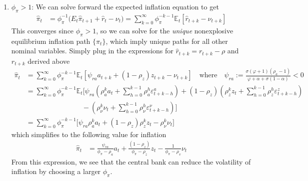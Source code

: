 \documentclass[12pt]{article}
\theoremstyle{plain}
\theoremstyle{definition}
\theoremstyle{remark}
\newcommand{\E}{\mathbb{E}}
\begin{document}
\begin{enumerate}[label=(\roman*)]
  \item $\phi_\pi>1$: We can solve forward the expected inflation
    equation to get
    \begin{align*}
      \hat{\pi}_t
      &=
      \phi_\pi^{-1}
      \big(
      E_t\hat{\pi}_{t+1} + \hat{r}_t - \nu_t
      \big)
      =
      \sum_{k=0}^\infty
      \phi_\pi^{-k-1}
      \E_t[\hat{r}_{t+k}-\nu_{t+k}]
    \end{align*}
    This converges since $\phi_\pi>1$, so we can solve for the
    \emph{unique} nonexplosive equilibrium inflation path
    $\{\pi_t\}$, which imply unique paths for all other nominal
    variables. Simply plug in the expressions for
    $\hat{r}_{t+k}=r_{t+k}-\rho$ and $r_{t+k}$ derived above
    \begin{align*}
      \hat{\pi}_t
      &=
      \sum_{k=0}^\infty
      \phi_\pi^{-k-1}
      \E_t\left[
      \psi_{ra}
      a_{t+k}
      + (1-\rho_z)z_{t+k}
      -\nu_{t+k}
      \right]
      \quad\text{where}\quad
      \psi_{ra}
      :=
      \frac{\sigma(\varphi + 1)(\rho_a-1)}{\varphi +\alpha+ \sigma(1-\alpha)}
      < 0
      \\
      &=
      \sum_{k=0}^\infty
      \phi_\pi^{-k-1}
      \E_t\bigg[
      \psi_{ra}
      \left(
      \rho_a^k a_t
      + \sum_{h=0}^{k-1} \rho_a^h\varepsilon^a_{t+k-h}
      \right)
      + (1-\rho_z)
      \left(
      \rho_z^k z_t
      + \sum_{h=0}^{k-1} \rho_z^h\varepsilon^z_{t+k-h}
      \right)
      \\
      &\qquad\qquad\qquad\qquad
      -
      \left(
      \rho_\nu^k \nu_t
      + \sum_{h=0}^{k-1} \rho_\nu^h\varepsilon^\nu_{t+k-h}
      \right)
      \bigg]
      \\
      &=
      \sum_{k=0}^\infty
      \phi_\pi^{-k-1}
      \big[
      \psi_{ra}
      \rho_a^k a_t
      + (1-\rho_z)
      \rho_z^k z_t
      -\rho_\nu^k\nu_{t}
      \big]
    \end{align*}
    which simplifies to the following value for inflation
    \begin{align*}
      \hat{\pi}_t
      &=
      \frac{\psi_{ra}}{\phi_\pi-\rho_a}a_t
      + \frac{(1-\rho_z)}{\phi_\pi-\rho_z}z_t
      - \frac{1}{\phi_\pi-\rho_v}\nu_t
    \end{align*}
    From this expression, we see that the central bank
    can reduce the volatility of inflation by choosing a larger
    $\phi_\pi$.


\end{enumerate}
\end{document}
